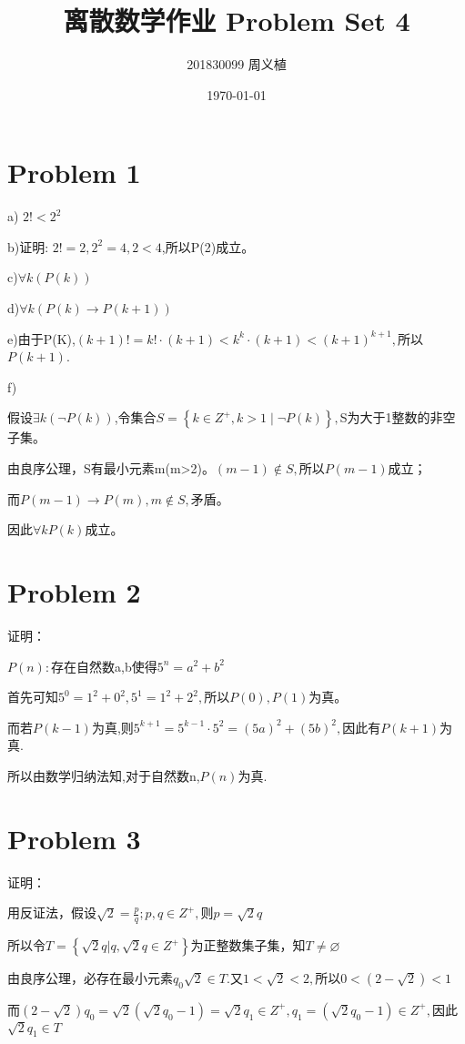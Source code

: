 \documentclass{article}
\title{离散数学作业 Problem Set 4}
\author{201830099 周义植}
\date{\today}
\begin{document}
\maketitle
\section*{Problem 1}
a) $2!<2^{2}$

b)证明:   $2!=2,2^{2}=4,2<4$,所以P(2)成立。

c)$\forall k(P(k))$

d)$\forall k(P(k)\rightarrow P(k+1))$

e)由于P(K),$(k+1)!=k!\cdot (k+1)<k^{k}\cdot (k+1)< (k+1)^{k+1},$所以$P(k+1)$.

f)

假设$\exists k(\neg P(k))$,令集合$S=\left\{k \in Z^{+},k>1 \mid \neg P(k)\right\},$S为大于1整数的非空子集。

由良序公理，S有最小元素m(m>2)。$(m-1)\notin S,$所以$P(m-1)$成立；

而$P(m-1)\rightarrow P(m),m\notin S,$矛盾。

因此$\forall kP(k)$成立。

\section*{Problem 2}
证明：

$P(n):$存在自然数a,b使得$5^{n}=a^{2}+b^{2}$

首先可知$5^0 = 1^2+0^2,5^1=1^2+2^2,$所以$P(0),P(1)$为真。

而若$P(k-1)$为真,则$5^{k+1}=5^{k-1}\cdot 5^2 = (5a)^{2}+(5b)^{2},$因此有$P(k+1)$为真.

所以由数学归纳法知,对于自然数n,$P(n)$为真.

\section*{Problem 3} 
证明：

用反证法，假设$\sqrt{2}=\frac{p}{q};p,q\in Z^{+},$则$p=\sqrt{2}q$

所以令$T=\left\{\sqrt{2}q |q,\sqrt{2}q \in Z^{+}  \right\}$为正整数集子集，知$T\neq \varnothing$

由良序公理，必存在最小元素$q_{0}\sqrt{2}\in T.$又$1<\sqrt{2}<2,$所以$0<(2-\sqrt{2})<1$

而$(2-\sqrt{2})q_{0}=\sqrt{2}(\sqrt{2}q_{0}-1)=\sqrt{2}q_{1} \in Z^{+},q_{1}=(\sqrt{2}q_{0}-1)\in Z^{+},$因此$\sqrt{2}q_{1}\in T$
\end{document}
